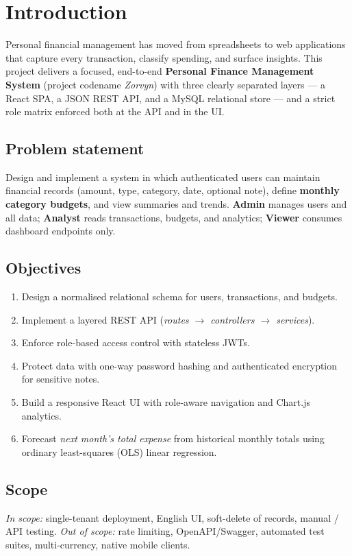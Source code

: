 \documentclass[11pt,a4paper]{article}
\begin{document}
\section{Introduction}
Personal financial management has moved from spreadsheets to web
applications that capture every transaction, classify spending, and
surface insights. This project delivers a focused, end-to-end
\textbf{Personal Finance Management System} (project codename
\textit{Zorvyn}) with three clearly separated layers --- a React SPA, a
JSON REST API, and a MySQL relational store --- and a strict role
matrix enforced both at the API and in the UI.

\subsection{Problem statement}
Design and implement a system in which authenticated users can
maintain financial records (amount, type, category, date, optional
note), define \textbf{monthly category budgets}, and view summaries and
trends. \textbf{Admin} manages users and all data; \textbf{Analyst}
reads transactions, budgets, and analytics; \textbf{Viewer} consumes
dashboard endpoints only.

\subsection{Objectives}
\begin{enumerate}
  \item Design a normalised relational schema for users, transactions, and budgets.
  \item Implement a layered REST API (\emph{routes $\rightarrow$ controllers $\rightarrow$ services}).
  \item Enforce role-based access control with stateless JWTs.
  \item Protect data with one-way password hashing and authenticated encryption for sensitive notes.
  \item Build a responsive React UI with role-aware navigation and Chart.js analytics.
  \item Forecast \emph{next month's total expense} from historical monthly totals using ordinary least-squares (OLS) linear regression.
\end{enumerate}

\subsection{Scope}
\textit{In scope:} single-tenant deployment, English UI, soft-delete
of records, manual / API testing. \textit{Out of scope:} rate
limiting, OpenAPI/Swagger, automated test suites, multi-currency,
native mobile clients.
\end{document}
